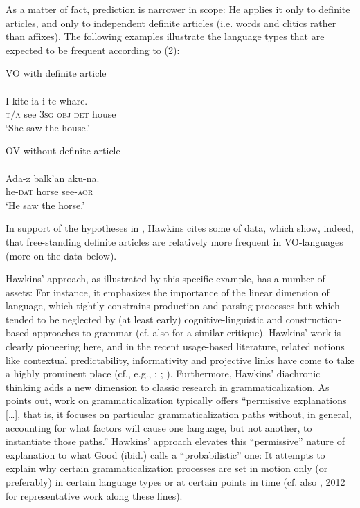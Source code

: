 \documentclass[output=paper]{langsci/langscibook}
\begin{document}
As a matter of fact,  prediction is narrower in scope: He applies it only to definite articles, and only to independent definite articles (i.e. words and clitics rather than affixes). The following examples illustrate the language types that are expected to be frequent according to (2):

\ea\label{ex:ksb:2}
\ea  VO with definite article\\
\\
\gll I kite ia i te whare.\\
     \textsc{t/a}   see \textsc{3sg}   \textsc{obj}   \textsc{det}   house\\
\glt ‘She saw the house.’

\ex
 OV without definite article\\ 
\\
\gll Ada-z  balk’an   aku-na.\\
     he-\textsc{dat}   horse     see-\textsc{aor}\\
\glt ‘He saw the horse.’
\z
\z

In support of the hypotheses in , Hawkins cites some of  data, which show, indeed, that free-standing definite articles are relatively more frequent in VO-languages (more on the data below).

Hawkins’ approach, as illustrated by this specific example, has a number of assets: For instance, it emphasizes the importance of the linear dimension of language, which tightly constrains production and parsing processes but which tended to be neglected by (at least early) cognitive-linguistic and construction-based approaches to grammar (cf. also \citealt{Diessel2011} for a similar critique). Hawkins’ work is clearly pioneering here, and in the recent usage-based literature, related notions like contextual predictability, informativity and projective links have come to take a highly prominent place (cf., e.g., \citealt{GahlGarnsey2004}; \citealt{Levy2008}; \citealt{Auer2009}). Furthermore, Hawkins’ diachronic thinking adds a new dimension to classic research in grammaticalization. As \citet[7]{Good2008} points out, work on grammaticalization typically offers “permissive explanations […], that is, it focuses on particular grammaticalization paths without, in general, accounting for what factors will cause one language, but not another, to instantiate those paths.” Hawkins’ approach elevates this “permissive” nature of explanation to what Good (ibid.) calls a “probabilistic” one: It attempts to explain why certain grammaticalization processes are set in motion only (or preferably) in certain language types or at certain points in time (cf. also \citealt{Hawkins1986}, 2012 for representative work along these lines).
\end{document}
